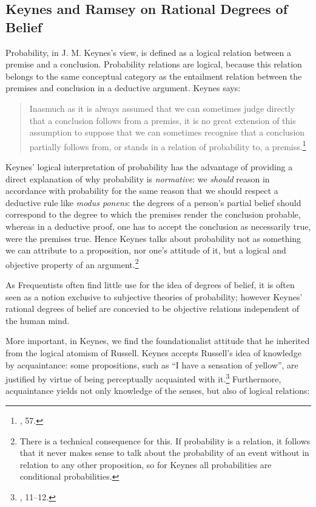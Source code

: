 \hypertarget{rational-degrees-of-belief}{%
\subsection{Keynes and Ramsey on Rational Degrees of
Belief}\label{sec:rational-degrees-of-belief}}

Probability, in J. M. Keynes's view, is defined as a logical relation between
a premise and a conclusion. Probability relations are logical, because
this relation belongs to the same conceptual category as the entailment
relation between the premises and conclusion in a deductive argument.
Keynes says:

\begin{quote}
Inasmuch as it is always assumed that we can sometimes judge directly
that a conclusion follows from a premiss, it is no great extension of
this assumption to suppose that we can sometimes recognise that a
conclusion partially follows from, or stands in a relation of
probability to, a premiss.\footnote{\cite{keynes}, 57.}
\end{quote}

Keynes' logical interpretation of probability has the advantage of
providing a direct explanation of why probability is \emph{normative}:
we \emph{should} reason in accordance with probability for the same reason
that we should respect a deductive rule like \emph{modus ponens}: the
degrees of a person's partial belief should correspond to the degree to
which the premises render the conclusion probable, whereas in a
deductive proof, one has to accept the conclusion as necessarily true,
were the premises true. Hence Keynes talks about probability not as
something we can attribute to a proposition, nor one's attitude of it,
but a logical and objective property of an argument.\footnote{There is a technical
  consequence for this. If probability is a relation, it follows that it
  never makes sense to talk about the probability of an event without in
  relation to any other proposition, so for Keynes all probabilities are
  conditional probabilities.}

As Frequentists often find little use for the idea of degrees of belief,
it is often seen as a notion exclusive to subjective theories of
probability; however Keynes' rational degrees of belief are concevied to
be objective relations independent of the human mind.

More important, in Keynes, we find the foundationalist attitude that he
inherited from the logical atomism of Russell. Keynes accepts Russell's
idea of knowledge by acquaintance: some propositions, such as ``I have a
sensation of yellow'', are justified by virtue of being perceptually
acquainted with it.\footnote{\cite{keynes}, 11--12.} Furthermore, acquaintance
yields not only knowledge of the senses, but also of logical relations:

